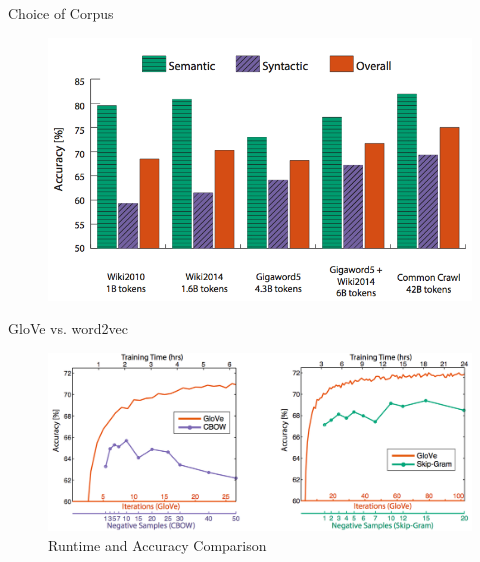 \begin{frame}{Choice of Corpus}
  \begin{figure}
    \centering
    \includegraphics[scale=0.4]{images/corpus.png}
  \end{figure}
\end{frame}


\begin{frame}{GloVe vs. word2vec}
  \begin{figure}
    \centering
    \includegraphics[scale=0.29]{images/gloveVSword2vec.png}
    \caption{Runtime and Accuracy Comparison}
  \end{figure}
\end{frame}


